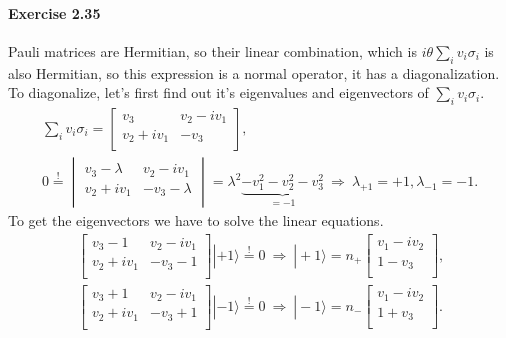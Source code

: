 \documentclass[a4paper,12pt]{article}
\newcommand{\exercise}[1]{\paragraph{Exercise #1}}
\newcommand{\ra}{\rangle}
\begin{document}
    \exercise{2.35} Pauli matrices are Hermitian, so their linear combination, which is $i \theta \sum_i v_i \sigma_i$ is also Hermitian, so this expression is a normal operator, it has a diagonalization. To diagonalize, let's first find out it's eigenvalues and eigenvectors of $\sum_i v_i \sigma_i$.
    \begin{gather}
        \nonumber
        \sum_i v_i \sigma_i =
        \begin{bmatrix}
            v_3 & v_2 - i v_1\\
            v_2 + i v_1 & -v_3\\
        \end{bmatrix} \textrm{,} \\
        0 \overset{!}{=} \begin{vmatrix}
            v_3 - \lambda & v_2 - i v_1\\
            v_2 + i v_1 & -v_3 - \lambda\\
        \end{vmatrix} = \lambda^2 \underbrace{- v_1^2 - v_2^2 - v_3^2}_{= -1} \ \Rightarrow\ \lambda_{+1} = +1, \lambda_{-1} = -1 \textrm{.}
    \end{gather}
    To get the eigenvectors we have to solve the linear equations.
    \begin{gather}
        \nonumber
        \begin{bmatrix}
            v_3 - 1 & v_2 - i v_1\\
            v_2 + i v_1 & -v_3 - 1\\
        \end{bmatrix}
        | +1 \ra \overset{!}{=} 0 \ \Rightarrow\ 
        | +1 \ra = n_+
        \begin{bmatrix}
            v_1 - iv_2\\
            1 - v_3\\
        \end{bmatrix}
        \textrm{,} \\
        \begin{bmatrix}
            v_3 + 1 & v_2 - i v_1\\
            v_2 + i v_1 & -v_3 + 1\\
        \end{bmatrix}
        | -1 \ra \overset{!}{=} 0 \ \Rightarrow\ 
        | -1 \ra = n_-
        \begin{bmatrix}
            v_1 - iv_2\\
            1 + v_3\\
        \end{bmatrix}
        \textrm{.}
    \end{gather}
\end{document}
